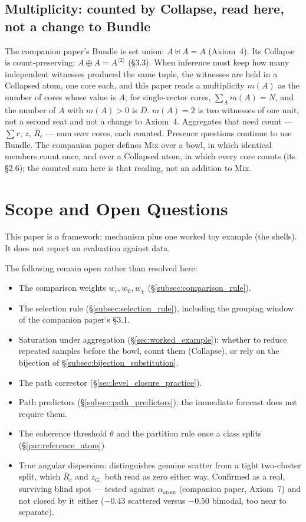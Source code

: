 \documentclass[12pt, a4paper]{article}
\begin{document}
\subsection{Multiplicity: counted by Collapse, read here, not a change to Bundle}
\label{subsec:multiplicity_reading}
The companion paper's Bundle is set union: $A\uplus A=A$ (Axiom~4). Its
Collapse is count-preserving: $A\oplus A=A^{\langle 2\rangle}$
(\S3.3). When inference must keep how many independent witnesses
produced the same tuple, the witnesses are held in a Collapsed atom,
one core each, and this paper reads a multiplicity $m(A)$ as the
number of cores whose value is $A$; for single-vector cores,
$\sum_A m(A)=N$, and the number of $A$ with $m(A)>0$ is $D$.
$m(A)=2$ is two witnesses of one unit, not a second seat and not a
change to Axiom~4. Aggregates that need count --- $\sum r$, $z$,
$\bar R_c$ --- sum over cores, each counted. Presence questions
continue to use Bundle. The companion paper defines Mix over a bowl, in
which identical members count once, and over a Collapsed atom, in which
every core counts (its \S2.6); the counted sum here is that reading, not
an addition to Mix.

\section{Scope and Open Questions}
\label{sec:scope}

This paper is a framework: mechanism plus one worked toy example
(the shells). It does not report an evaluation against data.

The following remain open rather than resolved here:

\begin{itemize}
\item The comparison weights $w_r,w_{\hat n},w_\chi$
      (\S\ref{subsec:comparison_rule}).
\item The selection rule (\S\ref{subsec:selection_rule}), including the grouping window of the companion paper's \S3.1.
\item Saturation under aggregation (\S\ref{sec:worked_example}):
      whether to reduce repeated samples before the bowl, count them (Collapse), or rely on the bijection of \S\ref{subsec:bijection_substitution}.
\item The path corrector (\S\ref{sec:level_closure_practice}).
\item Path predictors (\S\ref{subsec:path_predictors}); the immediate
      forecast does not require them.
\item The coherence threshold $\theta$ and the partition rule once a
      class splits (\S\ref{par:reference_atom}).
\item True angular dispersion: distinguishes genuine scatter from a
      tight two-cluster split, which $\bar R_c$ and $z_{G_c}$ both
      read as zero either way. Confirmed as a real, surviving blind
      spot --- tested against $\alpha_{\text{atom}}$ (companion
      paper, Axiom~7) and not closed by it either ($-0.43$ scattered
      versus $-0.50$ bimodal, too near to separate).
\end{itemize}
\end{document}
